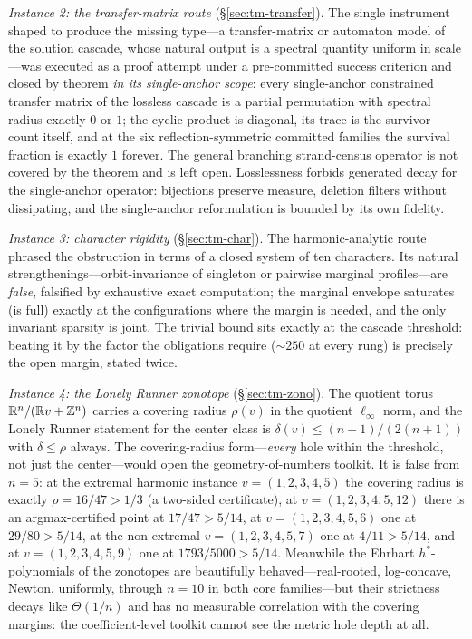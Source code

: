 \emph{Instance 2: the transfer-matrix route} (\S\ref{sec:tm-transfer}).
The single instrument shaped to produce the missing type---a
transfer-matrix or automaton model of the solution cascade, whose natural
output is a spectral quantity uniform in scale---was executed as a proof
attempt under a pre-committed success criterion and closed by theorem
\emph{in its single-anchor scope}: every single-anchor constrained
transfer matrix of the lossless cascade is a partial
permutation with spectral radius exactly $0$ or $1$; the cyclic product is
diagonal, its trace is the survivor count itself, and at the six
reflection-symmetric committed families the survival fraction is exactly
$1$ forever. The general branching strand-census operator is not covered
by the theorem and is left open. Losslessness forbids generated decay
for the single-anchor operator: bijections preserve
measure, deletion filters without dissipating, and the single-anchor
reformulation is bounded by its own fidelity.

\emph{Instance 3: character rigidity} (\S\ref{sec:tm-char}). The
harmonic-analytic route phrased the obstruction in terms of a closed
system of ten characters. Its natural strengthenings---orbit-invariance
of singleton or pairwise marginal profiles---are \emph{false}, falsified
by exhaustive exact computation; the marginal envelope saturates (is
full) exactly at the configurations where the margin is needed, and the
only invariant sparsity is joint. The trivial bound sits exactly at the
cascade threshold: beating it by the factor the obligations require
($\sim\!250$ at every rung) is precisely the open margin, stated twice.

\emph{Instance 4: the Lonely Runner zonotope}
(\S\ref{sec:tm-zono}). The quotient torus $\mathbb{R}^n/(\mathbb{R} v+\mathbb{Z}^n)$ carries a
covering radius $\rho(v)$ in the quotient $\ell_\infty$ norm, and the
Lonely Runner statement for the center class is
$\delta(v)\le (n{-}1)/(2(n{+}1))$ with $\delta\le\rho$ always. The
covering-radius form---\emph{every} hole within the threshold, not just
the center---would open the geometry-of-numbers toolkit. It is false from
$n=5$: at the extremal harmonic instance $v=(1,2,3,4,5)$ the covering
radius is exactly $\rho=16/47>1/3$ (a two-sided certificate), at
$v=(1,2,3,4,5,12)$ there is an argmax-certified point at $17/47>5/14$,
at $v=(1,2,3,4,5,6)$ one at
$29/80>5/14$, at the non-extremal $v=(1,2,3,4,5,7)$ one at
$4/11>5/14$, and at $v=(1,2,3,4,5,9)$ one at $1793/5000>5/14$. Meanwhile the Ehrhart $h^*$-polynomials of the zonotopes
are beautifully behaved---real-rooted, log-concave, Newton, uniformly,
through $n=10$ in both core families---but their strictness decays like
$\Theta(1/n)$ and has no measurable correlation with the covering
margins: the coefficient-level toolkit cannot see the metric hole depth
at all.

